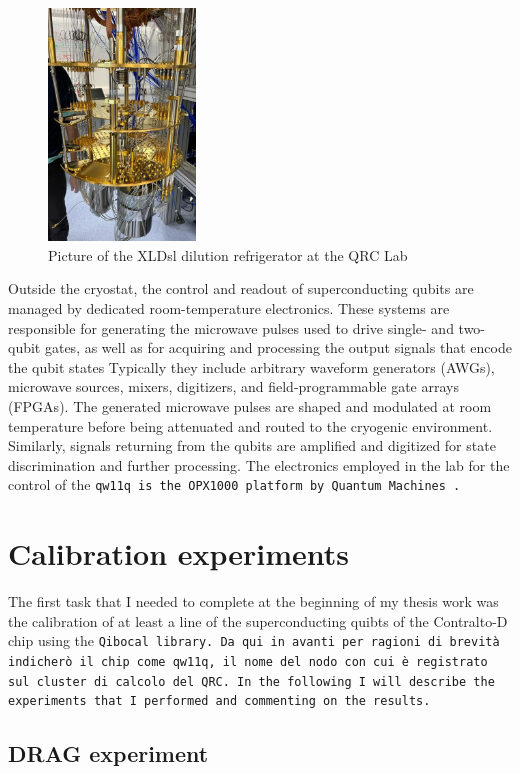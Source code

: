 \begin{figure}[h!]
    \centering
    \includegraphics[width=0.35\textwidth]{figures/png/XLD1000.png}
    \caption{Picture of the XLDsl dilution refrigerator at the QRC Lab}
    \label{fig:XLDsl}
\end{figure}

Outside the cryostat, the control and readout of superconducting qubits are managed by dedicated room-temperature electronics.
These systems are responsible for generating the microwave pulses used to drive single- and two-qubit gates, as well as for acquiring and processing the output signals that encode the qubit states 
Typically they include arbitrary waveform generators (AWGs), microwave sources, mixers, digitizers, and field-programmable gate arrays (FPGAs).
The generated microwave pulses are shaped and modulated at room temperature before being attenuated and routed to the cryogenic environment. 
Similarly, signals returning from the qubits are amplified and digitized for state discrimination and further processing. 
The electronics employed in the lab for the control of the \tt{qw11q} is the OPX1000 platform by Quantum Machines \cite{opx1000}.

\section{Calibration experiments}

The first task that I needed to complete at the beginning of my thesis work was the calibration of at least a line of the superconducting quibts of the Contralto-D chip using the \tt{Qibocal} library.
Da qui in avanti per ragioni di brevità indicherò il chip come \tt{qw11q}, il nome del nodo con cui è registrato sul cluster di calcolo del QRC.
In the following I will describe the experiments that I performed and commenting on the results.

\subsection{DRAG experiment}\label{sec:DRAG}
\cite{Motzoi_2009}\cite{Gambetta_2011}


